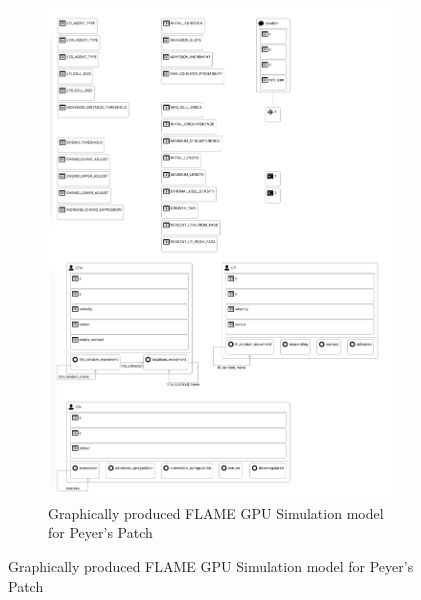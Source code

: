 \documentclass{UoYCSproject}
\begin{document}
\begin{figure}[htp]
\centering
\begin{subfigure}{\textwidth}
\centering
\includegraphics[width=\textwidth]{Appendix/ppsim_gmf}
\caption{Graphically produced \gls{FLAME GPU} Simulation model for Peyer's Patch}
\label{fig:ppsim_gmf}
\end{subfigure}%
\end{figure}
\end{document}
